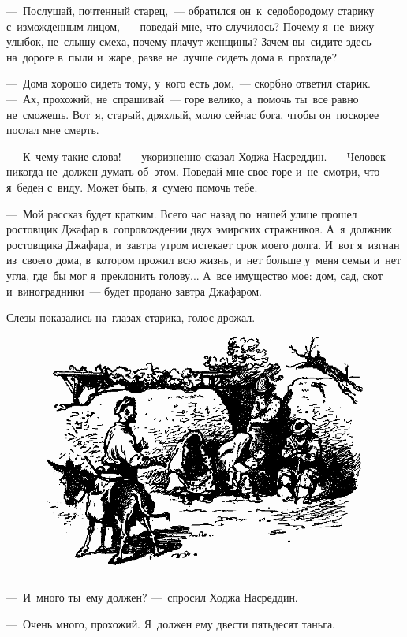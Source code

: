 \documentclass[12pt,a4paper]{book}
\begin{document}
—~Послушай, почтенный старец,~— обратился он~к~седобородому старику с~изможденным лицом,~— поведай мне, что случилось? Почему я~не~вижу улыбок, не~слышу смеха, почему плачут женщины? Зачем вы~сидите здесь на~дороге в~пыли и~жаре, разве не~лучше сидеть дома в~прохладе?

—~Дома хорошо сидеть тому, у~кого есть дом,~— скорбно ответил старик. —~Ах, прохожий, не~спрашивай~— горе велико, а~помочь ты~все равно не~сможешь. Вот~я, старый, дряхлый, молю сейчас бога, чтобы он~поскорее послал мне смерть.

—~К~чему такие слова! —~укоризненно сказал Ходжа Насреддин. —~Человек никогда не~должен думать об~этом. Поведай мне свое горе и~не~смотри, что я~беден с~виду. Может быть, я~сумею помочь тебе.

—~Мой рассказ будет кратким. Всего час назад по~нашей улице прошел ростовщик Джафар в~сопровождении двух эмирских стражников. А~я~должник ростовщика Джафара, и~завтра утром истекает срок моего долга. И~вот я~изгнан из~своего дома, в~котором прожил всю жизнь, и~нет больше у~меня семьи и~нет угла, где~бы мог я~преклонить голову... А~все имущество мое: дом, сад, скот и~виноградники~— будет продано завтра Джафаром.

Слезы показались на~глазах старика, голос дрожал.

\begin{figure}[h]
\centering
\includegraphics[width=\textwidth]{4.png}
\end{figure}

—~И~много ты~ему должен? —~спросил Ходжа Насреддин.

—~Очень много, прохожий. Я~должен ему двести пятьдесят таньга.
\end{document}
